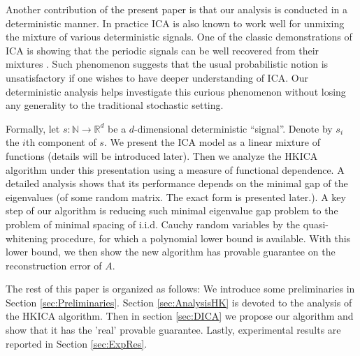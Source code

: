 \documentclass[twoside]{article}
\newcommand{\ra}{\rightarrow}
\newcommand{\real}{\mathbb{R}}
\renewcommand{\natural}{\mathbb{N}}
\theoremstyle{definition}
\begin{document}
Another contribution of the present paper is that our analysis is conducted in a deterministic manner. 
In practice ICA is also known to work well for unmixing the mixture of various deterministic signals. 
One of the classic demonstrations of ICA is showing that the periodic signals can be well recovered from their mixtures \citep{HyvOja00}.
Such phenomenon suggests that the usual probabilistic notion is unsatisfactory if one wishes to have deeper understanding of ICA.   
Our deterministic analysis helps investigate this curious phenomenon without losing any generality to the traditional stochastic setting. 

Formally, let $s:\natural \ra \real^d$ be a $d$-dimensional deterministic ``signal''. 
Denote by $s_i$ the $i$th component of $s$.
We present the ICA model as a linear mixture of functions (details will be introduced later).
Then we analyze the HKICA algorithm \citep{hsu2013learning} under this presentation using a measure of functional dependence.
A detailed analysis shows that its performance depends on the minimal gap of the eigenvalues (of some random matrix. The exact form is presented later.).
A key step of our algorithm is reducing such minimal eigenvalue gap problem to the problem of minimal spacing of i.i.d. Cauchy random variables by the quasi-whitening procedure, for which a polynomial lower bound is available.
With this lower bound, we then show the new algorithm has provable guarantee on the reconstruction error of $A$. 

The rest of this paper is organized as follows: 
We introduce some preliminaries in Section \ref{sec:Preliminaries}. Section \ref{sec:AnalysisHK} is devoted to the analysis of the HKICA algorithm. Then in section \ref{sec:DICA} we propose our algorithm and show that it has the 'real' provable guarantee.
Lastly, experimental results are reported in Section \ref{sec:ExpRes}.
\end{document}
